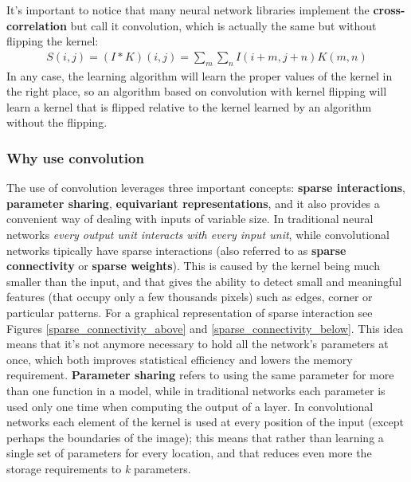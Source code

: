\documentclass[11pt,a4paper,titlepage]{book}
\begin{document}
\newline
It's important to notice that many neural network libraries implement the \textbf{cross-correlation} but call it convolution, which is actually the same but without flipping the kernel:
\begin{align}
    S(i,j) = (I*K)(i,j) = \sum_{m}\sum_{n}I(i+m, j+n) K(m,n)
\end{align}
In any case, the learning algorithm will learn the proper values of the kernel in the right place, so an algorithm based on convolution with kernel flipping will learn a kernel that is flipped relative to the kernel learned by an algorithm without the flipping.

\subsubsection{Why use convolution}
The use of convolution leverages three important concepts: \textbf{sparse interactions}, \textbf{parameter sharing}, \textbf{equivariant representations}, and it also provides a convenient way of dealing with inputs of variable size.
\newline
In traditional neural networks \textit{every output unit interacts with every input unit}, while convolutional networks tipically have sparse interactions (also referred to as \textbf{sparse connectivity} or \textbf{sparse weights}). This is caused by the kernel being much smaller than the input, and that gives the ability to detect small and meaningful features (that occupy only a few thousands pixels) such as edges, corner or particular patterns.
For a graphical representation of sparse interaction see Figures \ref{sparse_connectivity_above} and \ref{sparse_connectivity_below}. This idea means that it's not anymore necessary to hold all the network's parameters at once, which both improves statistical efficiency and lowers the memory requirement.
\newline
\newline
\textbf{Parameter sharing} refers to using the same parameter for more than one function in a model, while in traditional networks each parameter is used only one time when computing the output of a layer. In convolutional networks each element of the kernel is used at every position of the input (except perhaps the boundaries of the image); this means that rather than learning a single set of parameters for every location, and that reduces even more the storage requirements to \textit{k} parameters. 
\end{document}
